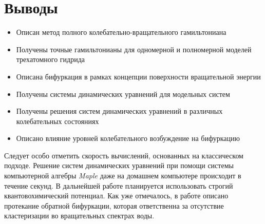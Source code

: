 \section*{Выводы}

\begin{itemize}
\item Описан метод полного колебательно-вращательного гамильтониана
\item Получены точные гамильтонианы для одномерной и полномерной моделей трехатомного гидрида
\item Описана бифуркация в рамках концепции поверхности вращательной энергии
\item Получены системы динамических уравнений для модельных систем
\item Получены решения систем динамических уравнений в различных колебательных состояниях 
\item Описано влияние уровней колебательного возбуждение на бифуркацию
\end{itemize}

Следует особо отметить скорость вычислений, основанных на классическом подходе. Решение систем динамических уравнений при помощи системы компьютерной алгебры \textit{Maple} даже на домашнем компьютере происходит в течение секунд.
В дальнейшей работе планируется использовать строгий квантовохимический потенциал. Как уже отмечалось, в работе \cite{petrov2002} описано протекание обратной бифуркации, которая ответственна за отсутствие кластеризации во вращательных спектрах воды.  

